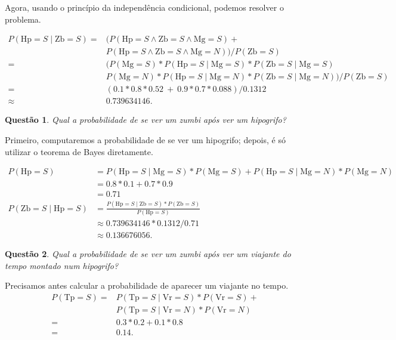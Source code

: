 \documentclass{article}
\newtheorem{question}{Questão}
\newcommand{\Mg}{\mathrm{Mg}}
\newcommand{\Vr}{\mathrm{Vr}}
\newcommand{\Hp}{\mathrm{Hp}}
\newcommand{\Zb}{\mathrm{Zb}}
\newcommand{\Tp}{\mathrm{Tp}}
\begin{document}
Agora, usando o princípio da independência condicional,
podemos resolver o problema.

\begin{align*}
    P( \Hp = S \mid \Zb = S) =&
        \Big( P( \Hp = S \wedge \Zb = S \wedge \Mg = S) + {} \\
        & P( \Hp = S \wedge \Zb = S \wedge \Mg = N) \Big) / P(\Zb = S)\\
        =& \Big( P(\Mg = S) * P(\Hp = S \mid \Mg = S) * P(\Zb = S \mid \Mg = S) \\
         & P(\Mg = N) * P(\Hp = S \mid \Mg = N) * P(\Zb = S \mid \Mg = N) \Big) /
           P(\Zb = S)\\
        =& ( 0.1*0.8*0.52 \ +\  0.9*0.7*0.088 ) / 0.1312 \\
        \approx & 0.739634146.
\end{align*}

\begin{question}
    Qual a probabilidade de se ver um zumbi após ver um hipogrifo?
\end{question}

Primeiro, computaremos a probabilidade de se ver um hipogrifo;
depois, é só utilizar o teorema de Bayes diretamente.

\begin{align*}
    P(\Hp = S) &= P(\Hp = S \mid \Mg = S) * P(\Mg = S) +
        P(\Hp = S \mid \Mg = N) * P(\Mg = N) \\
        &= 0.8*0.1 + 0.7*0.9 \\
        &= 0.71 \\
    P(\Zb = S \mid \Hp = S) &= \frac{P(\Hp = S \mid \Zb = S) * P(\Zb = S)}{P(\Hp = S)} \\
        &\approx 0.739634146 * 0.1312 / 0.71\\
        &\approx 0.136676056.
\end{align*}

\begin{question}
    Qual a probabilidade de se ver um zumbi
    após ver um viajante do tempo montado num hipogrifo?
\end{question}

Precisamos antes calcular a probabilidade de aparecer um viajante no tempo.
\begin{align*}
    P(\Tp = S) =& P(\Tp = S \mid \Vr = S) * P(\Vr = S) + {} \\
            & P(\Tp = S \mid \Vr = N) * P(\Vr = N) \\
            =& 0.3 * 0.2 + 0.1 *0.8 \\
            =& 0.14.
\end{align*}
\end{document}
